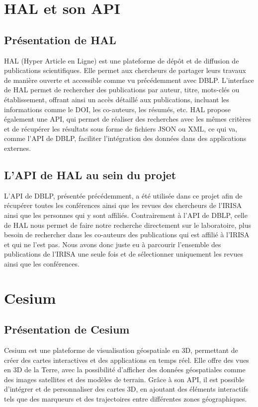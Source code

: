 \documentclass[a4paper,12pt]{article}
\begin{document}
\section{HAL et son API}

\subsection{Présentation de HAL}
HAL (Hyper Article en Ligne) est une plateforme de dépôt et de diffusion de publications scientifiques. Elle permet aux chercheurs de partager leurs travaux de manière ouverte et accessible comme vu précédemment avec DBLP. L'interface de HAL 
permet de rechercher des publications par auteur, titre, mots-clés ou établissement, offrant ainsi un accès détaillé aux publications, incluant les informations comme le DOI, les co-auteurs, les résumés, etc. HAL propose également une API, 
qui permet de réaliser des recherches avec les mêmes critères et de récupérer les résultats sous forme de fichiers JSON ou XML, ce qui va, comme l'API de DBLP, faciliter l'intégration des données dans des applications externes.

\subsection{L'API de HAL au sein du projet}
L'API de DBLP, présentée précédemment, a été utilisée dans ce projet afin de récupérer toutes les conférences ainsi que les revues des chercheurs de l'IRISA ainsi que les personnes qui y sont affiliés. Contrairement à l'API de DBLP, celle de HAL nous permet de 
faire notre recherche directement sur le laboratoire, plus besoin de rechercher dans les co-auteurs des publications qui est affilié à l'IRISA et qui ne l'est pas. Nous avons donc juste eu à parcourir l'ensemble des publications de l'IRISA une seule fois et de 
sélectionner uniquement les revues ainsi que les conférences.


\section{Cesium}

\subsection{Présentation de Cesium}
Cesium est une plateforme de visualisation géospatiale en 3D, permettant de créer des cartes interactives et des applications en temps réel. Elle offre des vues en 3D de la Terre, avec la possibilité d'afficher des données géospatiales comme 
des images satellites et des modèles de terrain. Grâce à son API, il est possible d'intégrer et de personnaliser des cartes 3D, en ajoutant des éléments interactifs tels que des marqueurs et des trajectoires entre différentes zones géographiques.
\end{document}
